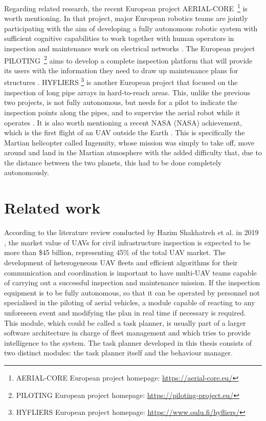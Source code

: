 Regarding related research, the recent European project AERIAL-CORE~\footnote{AERIAL-CORE European project homepage: \url{https://aerial-core.eu/}} is worth mentioning. In that project, major European robotics teams are jointly participating with the aim of developing a fully autonomous robotic system with sufficient cognitive capabilities to work together with human operators in inspection and maintenance work on electrical networks \cite{cacace2021safe}. The European project PILOTING~\footnote{PILOTING European project homepage: \url{https://piloting-project.eu/}} aims to develop a complete inspection platform that will provide its users with the information they need to draw up maintenance plans for structures \cite{benjumea2021localization}. HYFLIERS \footnote{HYFLIERS European project homepage: \url{https://www.oulu.fi/hyfliers/}} is another European project that focused on the inspection of long pipe arrays in hard-to-reach areas. This, unlike the previous two projects, is not fully autonomous, but needs for a pilot to indicate the inspection points along the pipes, and to supervise the aerial robot while it operates \cite{suarez2020aerial}. It is also worth mentioning a recent \acrshort{NASA} (\acrlong{NASA}) achievement, which is the first flight of an \gls{UAV} outside the Earth \cite{schroeder2020nasa, potter2020mars}. This is specifically the Martian helicopter called Ingenuity, whose mission was simply to take off, move around and land in the Martian atmosphere with the added difficulty that, due to the distance between the two planets, this had to be done completely autonomously.

\section{Related work}
\label{sec:RelatedWork}
According to the literature review conducted by Hazim Shakhatreh et al. in 2019 \cite{CivilAplications}, the market value of \glspl{UAV} for civil infrastructure inspection is expected to be more than \$45 billion, representing 45\% of the total \gls{UAV} market. The development of heterogeneous \gls{UAV} fleets and efficient algorithms for their communication and coordination is important to have multi-\gls{UAV} teams capable of carrying out a successful inspection and maintenance mission. If the inspection equipment is to be fully autonomous, so that it can be operated by personnel not specialised in the piloting of aerial vehicles, a module capable of reacting to any unforeseen event and modifying the plan in real time if necessary is required. This module, which could be called a task planner, is usually part of a larger software architecture in charge of fleet management and which tries to provide intelligence to the system. The task planner developed in this thesis consists of two distinct modules: the task planner itself and the behaviour manager.

